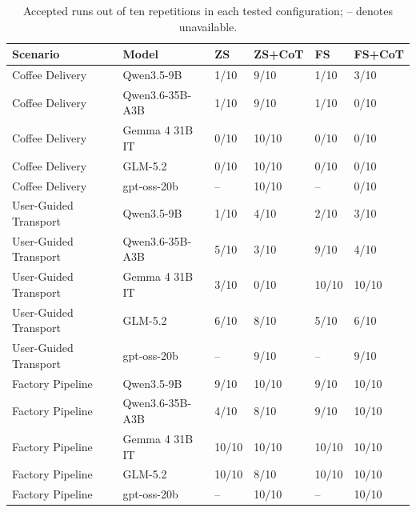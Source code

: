 \begin{table}
\caption{Accepted runs out of ten repetitions in each tested configuration; -- denotes unavailable.}
\label{tab:matrix}
\begin{tabular}{llllll}
\toprule
Scenario & Model & ZS & ZS+CoT & FS & FS+CoT \\
\midrule
Coffee Delivery & Qwen3.5-9B & 1/10 & 9/10 & 1/10 & 3/10 \\
Coffee Delivery & Qwen3.6-35B-A3B & 1/10 & 9/10 & 1/10 & 0/10 \\
Coffee Delivery & Gemma 4 31B IT & 0/10 & 10/10 & 0/10 & 0/10 \\
Coffee Delivery & GLM-5.2 & 0/10 & 10/10 & 0/10 & 0/10 \\
Coffee Delivery & gpt-oss-20b & -- & 10/10 & -- & 0/10 \\
User-Guided Transport & Qwen3.5-9B & 1/10 & 4/10 & 2/10 & 3/10 \\
User-Guided Transport & Qwen3.6-35B-A3B & 5/10 & 3/10 & 9/10 & 4/10 \\
User-Guided Transport & Gemma 4 31B IT & 3/10 & 0/10 & 10/10 & 10/10 \\
User-Guided Transport & GLM-5.2 & 6/10 & 8/10 & 5/10 & 6/10 \\
User-Guided Transport & gpt-oss-20b & -- & 9/10 & -- & 9/10 \\
Factory Pipeline & Qwen3.5-9B & 9/10 & 10/10 & 9/10 & 10/10 \\
Factory Pipeline & Qwen3.6-35B-A3B & 4/10 & 8/10 & 9/10 & 10/10 \\
Factory Pipeline & Gemma 4 31B IT & 10/10 & 10/10 & 10/10 & 10/10 \\
Factory Pipeline & GLM-5.2 & 10/10 & 8/10 & 10/10 & 10/10 \\
Factory Pipeline & gpt-oss-20b & -- & 10/10 & -- & 10/10 \\
\bottomrule
\end{tabular}
\end{table}
